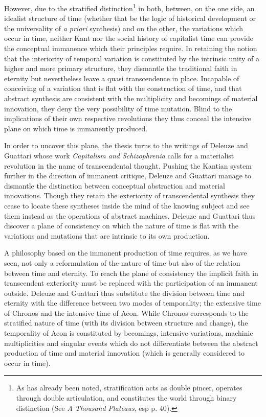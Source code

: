 However, due to the stratified distinction\footnote{As has already been noted, stratification acts as double pincer, operates through double articulation, and constitutes the world through binary distinction (See \textit{A Thousand Plateaus}, esp p. 40).} in both, between, on the one side, an idealist structure of time (whether that be the logic of historical development or the universality of \textit{a priori} synthesis) and on the other, the variations which occur in time, neither Kant nor the social history of capitalist time can provide the conceptual immanence which their principles require. In retaining the notion that the interiority of temporal variation is constituted by the intrinsic unity of a higher and more primary structure, they dismantle the traditional faith in eternity but nevertheless leave a quasi transcendence in place. Incapable of conceiving of a variation that is flat with the construction of time, and that abstract synthesis are consistent with the multiplicity and becomings of material innovation, they deny the very possibility of time mutation. Blind to the implications of their own respective revolutions they thus conceal the intensive plane on which time is immanently produced.

In order to uncover this plane, the thesis turns to the writings of Deleuze and Guattari whose work \textit{Capitalism and Schizophrenia} calls for a materialist revolution in the name of transcendental thought. Pushing the Kantian system further in the direction of immanent critique, Deleuze and Guattari manage to dismantle the distinction between conceptual abstraction and material innovations. Though they retain the exteriority of transcendental synthesis they cease to locate these syntheses inside the mind of the knowing subject and see them instead as the operations of abstract machines. Deleuze and Guattari thus discover a plane of consistency on which the nature of time is flat with the variations and mutations that are intrinsic to its own production. 

A philosophy based on the immanent production of time requires, as we
have seen, not only a reformulation of the nature of time but also of the relation between time and eternity. To reach the plane of consistency the implicit faith in transcendent exteriority must be replaced with the participation of an immanent outside. Deleuze and Guattari thus substitute the division between time and eternity with the difference between two modes of temporality; the extensive time of Chronos and the intensive time of Aeon. While Chronos corresponds to the stratified nature of time (with its division between structure and change), the temporality of Aeon is constituted by becomings, intensive variations, machinic multiplicities and singular events which do not differentiate between the abstract production of time and material innovation (which is generally considered to occur in time). 

